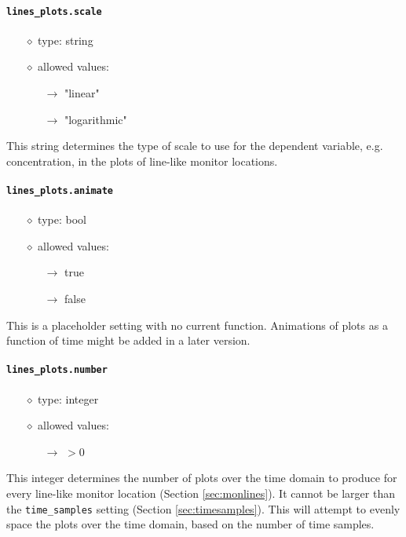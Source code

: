 \documentclass[]{article}
\def\code#1{\texttt{#1}}
\begin{document}
\paragraph{\code{lines\_plots.scale}}
\begin{itemize}
    \item[$\diamond$] type: string 
    \item[$\diamond$] allowed values:
    \begin{itemize}
        \item[$\rightarrow$] "linear"
        \item[$\rightarrow$] "logarithmic"
    \end{itemize}
\end{itemize}
This string determines the type of scale to use for the dependent variable, e.g.
concentration, in the plots of line-like monitor locations.

\paragraph{\code{lines\_plots.animate}}
\begin{itemize}
    \item[$\diamond$] type: bool 
    \item[$\diamond$] allowed values:
    \begin{itemize}
        \item[$\rightarrow$] true
        \item[$\rightarrow$] false
    \end{itemize}
\end{itemize}
This is a placeholder setting with no current function. Animations of plots as
a function of time might be added in a later version.


\paragraph{\code{lines\_plots.number}}
\begin{itemize}
    \item[$\diamond$] type: integer 
    \item[$\diamond$] allowed values:
    \begin{itemize}
        \item[$\rightarrow$] $>0$
    \end{itemize}
\end{itemize}
This integer determines the number of plots over the time domain to produce for
every line-like monitor location (Section \ref{sec:monlines}). It cannot be
larger than the \code{time\_samples} setting (Section \ref{sec:timesamples}).
This will attempt to evenly space the plots over the time domain, based on the
number of time samples.
\end{document}
